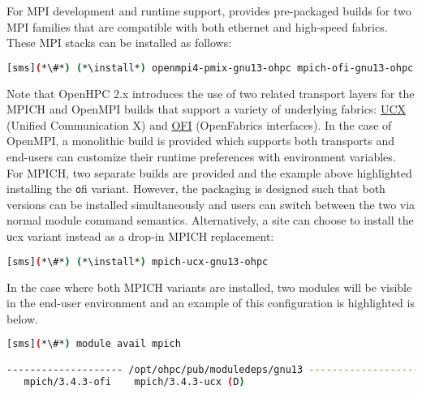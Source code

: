 For MPI development and runtime support, \OHPC{} provides pre-packaged builds
for two MPI families that are compatible with both ethernet and high-speed
fabrics.  These MPI stacks can be installed as follows:

\begin{lstlisting}[language=bash]
[sms](*\#*) (*\install*) openmpi4-pmix-gnu13-ohpc mpich-ofi-gnu13-ohpc
\end{lstlisting}

Note that OpenHPC 2.x introduces the use of two related transport layers for
the MPICH and OpenMPI builds that support a variety of underlying
fabrics: \href{https://www.openucx.org}{UCX} (Unified Communication X)
and \href{https://ofiwg.github.io/libfabric/}{OFI} (OpenFabrics interfaces).
In the case of OpenMPI, a monolithic build is provided which supports both
transports and end-users can customize their runtime preferences with
environment variables. For MPICH, two separate builds are provided and the
example above highlighted installing the {\texttt ofi} variant.  However, the
packaging is designed such that both versions can be installed simultaneously
and users can switch between the two via normal module command
semantics. Alternatively, a site can choose to install the {\texttt ucx} variant
instead as a drop-in MPICH replacement:

\begin{lstlisting}[language=bash]
[sms](*\#*) (*\install*) mpich-ucx-gnu13-ohpc
\end{lstlisting}

In the case where both MPICH variants are installed, two modules will be
visible in the end-user environment and an example of this configuration is
highlighted is below. 

\begin{lstlisting}[language=bash]
[sms](*\#*) module avail mpich

-------------------- /opt/ohpc/pub/moduledeps/gnu13 ---------------------
   mpich/3.4.3-ofi    mpich/3.4.3-ucx (D)
\end{lstlisting}





